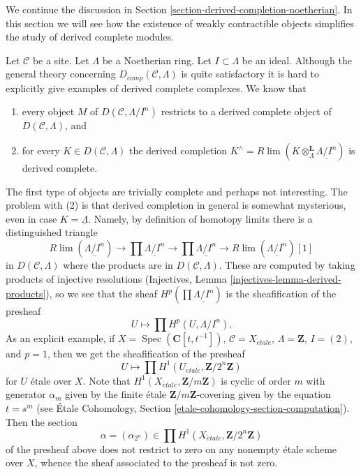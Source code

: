 \documentclass{stacks-project}
\theoremstyle{plain}
\theoremstyle{definition}
\theoremstyle{remark}
\numberwithin{equation}{subsection}
\def\lim{\mathop{\mathrm{lim}}\nolimits}
\def\Spec{\mathop{\mathrm{Spec}}}
\def\etale{{\acute{e}tale}}
\begin{document}
\noindent
We continue the discussion in
Section \ref{section-derived-completion-noetherian}.
In this section we will see how the existence of
weakly contractible objects simplifies the study
of derived complete modules.

\medskip\noindent
Let $\mathcal{C}$ be a site. Let $\Lambda$ be a Noetherian ring.
Let $I \subset \Lambda$ be an ideal. Although the general theory
concerning $D_{comp}(\mathcal{C}, \Lambda)$ is quite satisfactory
it is hard to explicitly give examples of derived complete complexes.
We know that
\begin{enumerate}
\item every object $M$ of $D(\mathcal{C}, \Lambda/I^n)$ restricts to a
derived complete object of $D(\mathcal{C}, \Lambda)$, and
\item for every $K \in D(\mathcal{C}, \Lambda)$ the derived completion
$K^\wedge = R\lim (K \otimes_\Lambda^\mathbf{L} \underline{\Lambda/I^n})$
is derived complete.
\end{enumerate}
The first type of objects are trivially complete and perhaps not
interesting. The problem with (2) is that derived completion
in general is somewhat mysterious, even in case $K = \underline{\Lambda}$.
Namely, by definition of homotopy limits there
is a distinguished triangle
$$
R\lim(\underline{\Lambda/I^n}) \to
\prod \underline{\Lambda/I^n} \to
\prod \underline{\Lambda/I^n} \to
R\lim(\underline{\Lambda/I^n})[1]
$$
in $D(\mathcal{C}, \Lambda)$ where the products are in
$D(\mathcal{C}, \Lambda)$. These are computed by taking products
of injective resolutions
(Injectives, Lemma \ref{injectives-lemma-derived-products}),
so we see that the sheaf $H^p(\prod \underline{\Lambda/I^n})$
is the sheafification of the presheaf
$$
U \longmapsto \prod H^p(U, \Lambda/I^n).
$$
As an explicit example, if $X = \Spec(\mathbf{C}[t, t^{-1}])$,
$\mathcal{C} = X_\etale$, $\Lambda = \mathbf{Z}$, $I = (2)$, and
$p = 1$, then we get the sheafification of the presheaf
$$
U \mapsto \prod H^1(U_\etale, \mathbf{Z}/2^n\mathbf{Z})
$$
for $U$ \'etale over $X$. Note that $H^1(X_\etale, \mathbf{Z}/m\mathbf{Z})$
is cyclic of order $m$ with generator $\alpha_m$ given by the finite \'etale
$\mathbf{Z}/m\mathbf{Z}$-covering given by the equation $t = s^m$
(see \'Etale Cohomology, Section \ref{etale-cohomology-section-computation}).
Then the section
$$
\alpha = (\alpha_{2^n}) \in \prod H^1(X_\etale, \mathbf{Z}/2^n\mathbf{Z})
$$
of the presheaf above does not restrict to zero on any nonempty \'etale
scheme over $X$, whence the sheaf associated to the presheaf is not zero.
\end{document}
